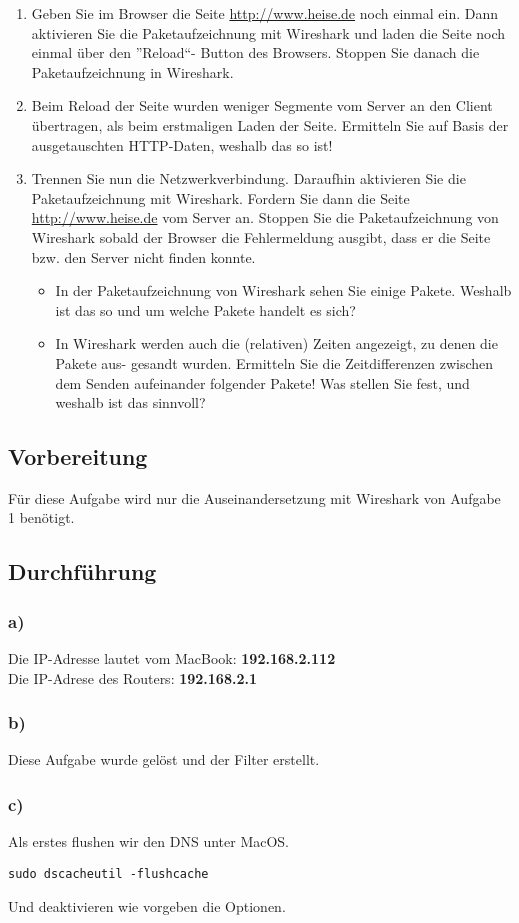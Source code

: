 \begin{enumerate}[label=(\alph*)]
	\item Geben Sie im Browser die Seite \url{http://www.heise.de} noch einmal ein. Dann aktivieren Sie die Paketaufzeichnung mit Wireshark und laden die Seite noch einmal über den ”Reload“- Button des Browsers. Stoppen Sie danach die Paketaufzeichnung in Wireshark.
	\item Beim Reload der Seite wurden weniger Segmente vom Server an den Client übertragen, als beim erstmaligen Laden der Seite. Ermitteln Sie auf Basis der ausgetauschten HTTP-Daten, weshalb das so ist!
	\item Trennen Sie nun die Netzwerkverbindung. Daraufhin aktivieren Sie die Paketaufzeichnung mit Wireshark. Fordern Sie dann die Seite \url{http://www.heise.de} vom Server an. Stoppen Sie die Paketaufzeichnung von Wireshark sobald der Browser die Fehlermeldung ausgibt,
dass er die Seite bzw. den Server nicht finden konnte.
	\begin{itemize}
	 \item In der Paketaufzeichnung von Wireshark sehen Sie einige Pakete. Weshalb ist das so und um welche Pakete handelt es sich?
	 \item In Wireshark werden auch die (relativen) Zeiten angezeigt, zu denen die Pakete aus- gesandt wurden. Ermitteln Sie die Zeitdifferenzen zwischen dem Senden aufeinander folgender Pakete! Was stellen Sie fest, und weshalb ist das sinnvoll?
	\end{itemize}
\end{enumerate}
\subsection{Vorbereitung}
Für diese Aufgabe wird nur die Auseinandersetzung mit Wireshark von Aufgabe 1 benötigt. 
\subsection{Durchführung}
\subsubsection{a)}
Die IP-Adresse lautet vom MacBook: \textbf{192.168.2.112}\\
Die IP-Adrese des Routers: \textbf{192.168.2.1}
\subsubsection{b)}
Diese Aufgabe wurde gelöst und der Filter erstellt.
\subsubsection{c)}
Als erstes flushen wir den DNS unter MacOS.
\begin{lstlisting}
sudo dscacheutil -flushcache
\end{lstlisting}
Und deaktivieren wie vorgeben die Optionen.
